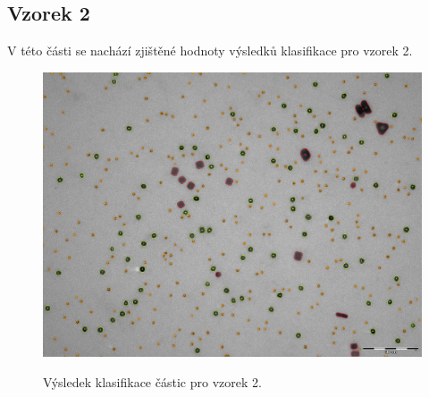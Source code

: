 \documentclass[11pt,twoside,a4paper,table]{book}
\begin{document}
\subsection{Vzorek 2}
V této části se nachází zjištěné hodnoty výsledků klasifikace pro vzorek 2.
\begin{figure}[h!]
\center
\includegraphics[width=\textwidth]{figures/multi2_klasifikace.png}
\label{fig:class2}
\caption{Výsledek klasifikace částic pro vzorek 2.}
\end{figure}
\end{document}
